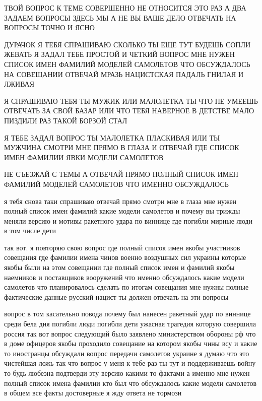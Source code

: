  
 
 
 
 

ТВОЙ ВОПРОС К ТЕМЕ СОВЕРШЕННО НЕ ОТНОСИТСЯ ЭТО РАЗ А ДВА ЗАДАЕМ ВОПРОСЫ ЗДЕСЬ
МЫ А НЕ ВЫ ВАШЕ ДЕЛО ОТВЕЧАТЬ НА ВОПРОСЫ ТОЧНО И ЯСНО

ДУРАЧОК Я ТЕБЯ СПРАШИВАЮ СКОЛЬКО ТЫ ЕЩЕ ТУТ БУДЕШЬ СОПЛИ ЖЕВАТЬ Я ЗАДАЛ ТЕБЕ
ПРОСТОЙ И ЧЕТКИЙ ВОПРОС МНЕ НУЖЕН СПИСОК ИМЕН ФАМИЛИЙ МОДЕЛЕЙ САМОЛЕТОВ ЧТО
ОБСУЖДАЛОСЬ НА СОВЕЩАНИИ ОТВЕЧАЙ МРАЗЬ НАЦИСТСКАЯ ПАДАЛЬ ГНИЛАЯ И ЛЖИВАЯ

Я СПРАШИВАЮ ТЕБЯ ТЫ МУЖИК ИЛИ МАЛОЛЕТКА ТЫ ЧТО НЕ УМЕЕШЬ ОТВЕЧАТЬ ЗА СВОЙ БАЗАР
ИЛИ ЧТО ТЕБЯ НАВЕРНОЕ В ДЕТСТВЕ МАЛО ПИЗДИЛИ РАЗ ТАКОЙ БОРЗОЙ СТАЛ

Я ТЕБЕ ЗАДАЛ ВОПРОС ТЫ МАЛОЛЕТКА ПЛАСКИВАЯ ИЛИ ТЫ МУЖЧИНА СМОТРИ МНЕ ПРЯМО В
ГЛАЗА И ОТВЕЧАЙ ГДЕ СПИСОК ИМЕН ФАМИЛИИ ЯВКИ МОДЕЛИ САМОЛЕТОВ

НЕ СЪЕЗЖАЙ С ТЕМЫ А ОТВЕЧАЙ ПРЯМО ПОЛНЫЙ СПИСОК ИМЕН ФАМИЛИЙ МОДЕЛЕЙ САМОЛЕТОВ
ЧТО ИМЕННО ОБСУЖДАЛОСЬ

я тебя снова таки спрашиваю отвечай прямо смотри мне в глаза мне нужен полный
список имен фамилий какие модели самолетов и почему вы трижды меняли версию и
мотивы ракетного удара по виннице где погибли мирные люди в том числе дети

так вот. я повторяю свою вопрос где полный список имен якобы участников
совещания где фамилии имена чинов военно воздушных сил украины которые якобы
были на этом совещании где полный список имен и фамилий якобы наемников и
поставщиков вооружений что именно обсуждалось какие модели самолетов что
планировалось сделать по итогам совещания мне нужны полные фактические данные
русский нацист ты должен отвечать на эти вопросы

вопрос в том касательно повода почему был нанесен ракетный удар по виннице
среди бела дня погибли люди погибли дети ужасная трагедия которую совершила
россия так вот вопрос следующий было заявлено министерством обороны рф что в
доме офицеров якобы проходило совещание на котором якобы чины всу и какие то
иностранцы обсуждали вопрос передачи самолетов украине я думаю что это
чистейшая ложь так что вопрос у меня к тебе раз ты тут и поддерживаешь войну то
будь любезна подтверди эту версию какими то фактами а именно мне нужен полный
список имена фамилии кто был что обсуждалось какие модели самолетов в общем все
факты достоверные я жду ответа не тормози


